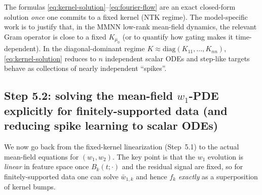 \begin{remark}
The formulas \eqref{eq:kernel-solution}--\eqref{eq:fourier-flow} are an exact closed-form solution \emph{once} one commits to a fixed kernel (NTK regime).
The model-specific work is to justify that, in the MMNN low-rank mean-field dynamics, the relevant Gram operator is close to a fixed $K_{\mu_0}$ (or to quantify how gating makes it time-dependent).
In the diagonal-dominant regime $K\approx \mathrm{diag}(K_{11},\dots,K_{nn})$, \eqref{eq:kernel-solution} reduces to $n$ independent scalar ODEs and step-like targets behave as collections of nearly independent ``spikes''.
\end{remark}

\subsection{Step 5.2: solving the mean-field $w_1$-PDE explicitly for finitely-supported data (and reducing spike learning to scalar ODEs)}
\label{subsec:step52}

We now go back from the fixed-kernel linearization (Step~5.1) to the actual mean-field equations for $(w_1,w_2)$.
The key point is that the $w_1$ evolution is \emph{linear} in feature space once $B_k(t;\cdot)$ and the residual signal are fixed, so for finitely-supported data one can solve $\bar w_{1,k}$ and hence $f_k$ \emph{exactly} as a superposition of kernel bumps.

